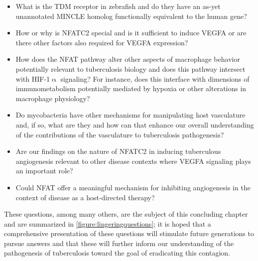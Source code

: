 \begin{itemize}
\item What is the TDM receptor in zebrafish and do they have an as\hyp{}yet unannotated MINCLE homolog functionally equivalent to the human gene? 
\item How or why is NFATC2 special and is it sufficient to induce VEGFA or are there other factors also required for VEGFA expression? 
\item How does the NFAT pathway alter other aspects of macrophage behavior potentially relevant to tuberculosis biology and does this pathway intersect with HIF\hyp{}1$\upalpha$ signaling? For instance, does this interface with dimensions of immunometabolism potentially mediated by hypoxia or other alterations in macrophage physiology?
\item Do mycobacteria have other mechanisms for manipulating host vasculature and, if so, what are they and how can that enhance our overall understanding of the contributions of the vasculature to tuberculosis pathogenesis? 
\item Are our findings on the nature of NFATC2 in inducing tuberculous angiogenesis relevant to other disease contexts where VEGFA signaling plays an important role? 
\item Could NFAT offer a meaningful mechanism for inhibiting angiogenesis in the context of disease as a host\hyp{}directed therapy?
\end{itemize}

These questions, among many others, are the subject of this concluding chapter and are summarized in \autoref{figure:lingeringquestions}; it is hoped that a comprehensive presentation of these questions will stimulate future generations to pursue answers and that these will further inform our understanding of the pathogenesis of tuberculosis toward the goal of eradicating this contagion.

